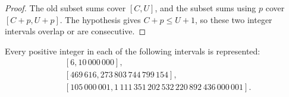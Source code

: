 \begin{proof}
The old subset sums cover $[C,U]$, and the subset sums using $p$ cover
$[C+p,U+p]$.  The hypothesis gives $C+p\leq U+1$, so these two integer
intervals overlap or are consecutive.
\end{proof}

\begin{proposition}
\label{prop:fraiture-finite}
Every positive integer in each of the following intervals is represented:
\begin{align}
 &[6,10\,000\,000],
 \label{eq:fraiture-small}\\
 &[469\,616,273\,803\,744\,799\,154],
 \label{eq:fraiture-first-window}\\
 &[105\,000\,001,
   1\,111\,351\,202\,532\,220\,892\,436\,000\,001].
 \label{eq:fraiture-large-window}
\end{align}
\end{proposition}

